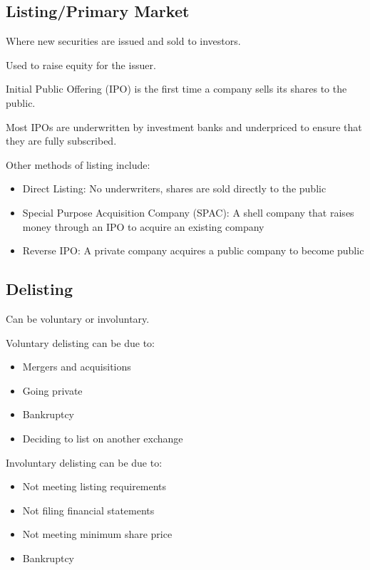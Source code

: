 \subsection{Listing/Primary Market}
Where new securities are issued and sold to investors.

Used to raise equity for the issuer.

Initial Public Offering (IPO) is the first time a company sells its shares to the public.

Most IPOs are underwritten by investment banks and underpriced to ensure that they are fully subscribed.

Other methods of listing include:
\begin{itemize}
    \item Direct Listing: No underwriters, shares are sold directly to the public
    \item Special Purpose Acquisition Company (SPAC): A shell company that raises money through an IPO to acquire an existing company
	\item Reverse IPO: A private company acquires a public company to become public
\end{itemize}

\subsection{Delisting}
Can be voluntary or involuntary.

Voluntary delisting can be due to:
\begin{itemize}
    \item Mergers and acquisitions
    \item Going private
    \item Bankruptcy
    \item Deciding to list on another exchange
\end{itemize}

Involuntary delisting can be due to:
\begin{itemize}
    \item Not meeting listing requirements
    \item Not filing financial statements
    \item Not meeting minimum share price
    \item Bankruptcy
\end{itemize}

